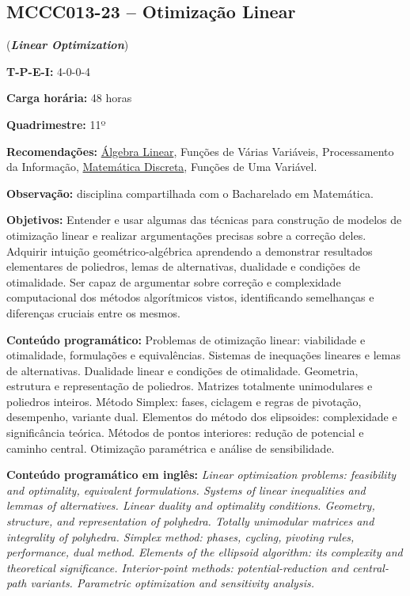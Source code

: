 \documentclass[class=article, crop=false]{standalone}
\begin{document}
\subsection*{MCCC013-23 -- Otimização Linear}
\label{disc:ol}

(\textbf{\textit{Linear Optimization}})

\begin{center}
    \begin{minipage}{0.85\textwidth}
        \textbf{T-P-E-I:} 4-0-0-4
        
        \textbf{Carga horária:} 48 horas
        
        \textbf{Quadrimestre:} 11º 
        
        \textbf{Recomendações:}
        \hyperref[disc:alge_lin]{Álgebra Linear},
        Funções de Várias Variáveis,
        Processamento da Informação,
        \hyperref[disc:mdI]{Matemática Discreta},
        Funções de Uma Variável.
        
        \textbf{Observação:} disciplina compartilhada com o Bacharelado em Matemática.
    \end{minipage}
\end{center}

\textbf{Objetivos:}
Entender e usar algumas das técnicas para construção de modelos de otimização
linear e realizar argumentações precisas sobre a correção deles. Adquirir
intuição geométrico-algébrica aprendendo a demonstrar resultados elementares de
poliedros, lemas de alternativas, dualidade e condições de otimalidade. Ser
capaz de argumentar sobre correção e complexidade computacional dos métodos
algorítmicos vistos, identificando semelhanças e diferenças cruciais entre os
mesmos.

\textbf{Conteúdo programático:} 
Problemas de otimização linear: viabilidade e otimalidade, formulações e equivalências.
Sistemas de inequações lineares e lemas de alternativas. 
Dualidade linear e condições de otimalidade.
Geometria, estrutura e representação de poliedros.
Matrizes totalmente unimodulares e poliedros inteiros.
Método Simplex: fases, ciclagem e regras de pivotação, desempenho, variante dual.
Elementos do método dos elipsoides: complexidade e significância teórica.
Métodos de pontos interiores: redução de potencial e caminho central.
Otimização paramétrica e análise de sensibilidade.

\textbf{Conteúdo programático em inglês:} 
\textit{ Linear optimization problems: feasibility and optimality, equivalent
formulations.  Systems of linear inequalities and lemmas of alternatives.
Linear duality and optimality conditions.  Geometry, structure, and
representation of polyhedra.  Totally unimodular matrices and integrality of
polyhedra.  Simplex method: phases, cycling, pivoting rules, performance, dual
method.  Elements of the ellipsoid algorithm: its complexity and theoretical
significance.  Interior-point methods: potential-reduction and central-path
variants.  Parametric optimization and sensitivity analysis. }
\end{document}
